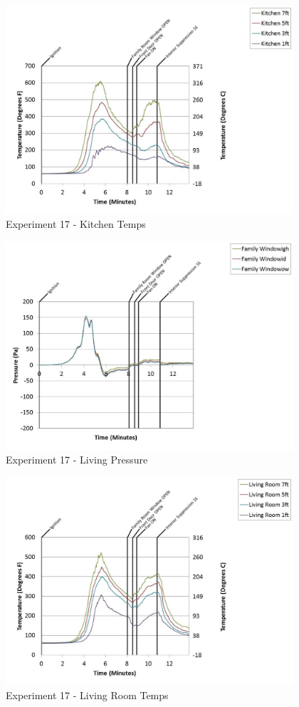 \documentclass{article}
\begin{document}
\begin{appendices}
	\begin{figure}[h!]
		\centering
		\includegraphics[height=3.05in]{0_Images/Results_Charts/Exp_17_Charts/KitchenTemps.pdf}
		\caption{Experiment 17 - Kitchen Temps}
	\end{figure}
 
	\clearpage

	\begin{figure}[h!]
		\centering
		\includegraphics[height=3.05in]{0_Images/Results_Charts/Exp_17_Charts/LivingPressure.pdf}
		\caption{Experiment 17 - Living Pressure}
	\end{figure}
 

	\begin{figure}[h!]
		\centering
		\includegraphics[height=3.05in]{0_Images/Results_Charts/Exp_17_Charts/LivingRoomTemps.pdf}
		\caption{Experiment 17 - Living Room Temps}
	\end{figure}
 

\end{appendices}
\end{document}
